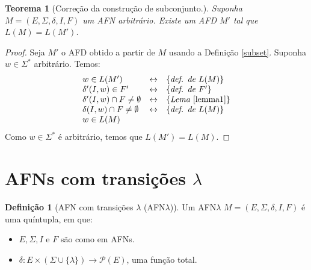 \documentclass[a4paper]{article}
\newtheorem{Theorem}{Teorema}
\theoremstyle{definition}
\newtheorem{Definition}{Definição}
\begin{document}
  \begin{Theorem}[Correção da construção de subconjunto.]
    Suponha $M=(E,\Sigma,\delta,I,F)$ um AFN arbitrário. Existe um AFD $M'$ tal
    que $L(M) = L(M')$. 
  \end{Theorem}
  \begin{proof}
    Seja $M'$ o AFD obtido a partir de $M$ usando a Definição \ref{subset}.
    Suponha $w\in\Sigma^*$ arbitrário. Temos:
    \[
      \begin{array}{lcl}
        w \in L(M') & \leftrightarrow & \{\textit{def. de }L(M)\}\\
        \delta'(I,w) \in F' & \leftrightarrow & \{\textit{def. de }F'\}\\
        \delta'(I,w) \cap F \neq \emptyset & \leftrightarrow & \{\textit{Lema }\ref{lemma1}\}\\
        \delta(I,w) \cap F \neq \emptyset & \leftrightarrow & \{\textit{def. de
                                                              }L(M)\}\\
        w \in L(M)
      \end{array}
    \]
    Como $w\in\Sigma^*$ é arbitrário, temos que $L(M') = L(M)$.
  \end{proof}

  \section{AFNs com transições $\lambda$}

  \begin{Definition}[AFN com transições $\lambda$ (AFN$\lambda$)]
    Um AFN$\lambda$ $M = (E,\Sigma, \delta,I,F)$ é uma quíntupla, em que:
    \begin{itemize}
      \item $E,\Sigma, I$ e $F$ são como em AFNs.
      \item $\delta : E \times (\Sigma \cup \{\lambda\}) \to \mathcal{P}(E)$,
        uma função total.
    \end{itemize}
  \end{Definition}
\end{document}
